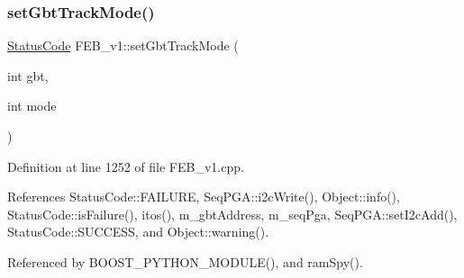 \subsubsection{\texorpdfstring{set\+Gbt\+Track\+Mode()}{setGbtTrackMode()}}
{\footnotesize\ttfamily \hyperlink{classStatusCode}{Status\+Code} F\+E\+B\+\_\+v1\+::set\+Gbt\+Track\+Mode (\begin{DoxyParamCaption}\item[{int}]{gbt,  }\item[{int}]{mode }\end{DoxyParamCaption})}



Definition at line 1252 of file F\+E\+B\+\_\+v1.\+cpp.



References Status\+Code\+::\+F\+A\+I\+L\+U\+RE, Seq\+P\+G\+A\+::i2c\+Write(), Object\+::info(), Status\+Code\+::is\+Failure(), itos(), m\+\_\+gbt\+Address, m\+\_\+seq\+Pga, Seq\+P\+G\+A\+::set\+I2c\+Add(), Status\+Code\+::\+S\+U\+C\+C\+E\+SS, and Object\+::warning().



Referenced by B\+O\+O\+S\+T\+\_\+\+P\+Y\+T\+H\+O\+N\+\_\+\+M\+O\+D\+U\+L\+E(), and ram\+Spy().


